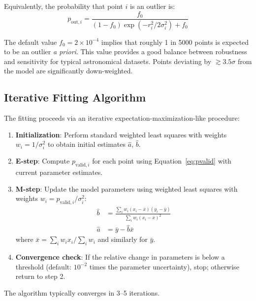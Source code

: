 \documentclass[twocolumn]{aastex631}
\begin{document}
Equivalently, the probability that point $i$ is an outlier is:
\begin{equation}
    p_{\mathrm{out},i} = \frac{f_0}{(1-f_0) \exp\left(-r_i^2/2\sigma_i^2\right) + f_0}
    \label{eq:pout}
\end{equation}

The default value $f_0 = 2 \times 10^{-4}$ implies that roughly 1 in 5000 points is
expected to be an outlier \emph{a priori}. This value provides a good balance between
robustness and sensitivity for typical astronomical datasets. Points deviating by
$\gtrsim 3.5\sigma$ from the model are significantly down-weighted.


\subsection{Iterative Fitting Algorithm}
\label{sec:algorithm}

The fitting proceeds via an iterative expectation-maximization-like procedure:

\begin{enumerate}
    \item \textbf{Initialization}: Perform standard weighted least squares with
          weights $w_i = 1/\sigma_i^2$ to obtain initial estimates $\hat{a}$, $\hat{b}$.
    
    \item \textbf{E-step}: Compute $p_{\mathrm{valid},i}$ for each point using
          Equation~\ref{eq:pvalid} with current parameter estimates.
    
    \item \textbf{M-step}: Update the model parameters using weighted least squares
          with weights $w_i = p_{\mathrm{valid},i}/\sigma_i^2$:
          \begin{align}
              \hat{b} &= \frac{\sum_i w_i (x_i-\bar{x})(y_i-\bar{y})}{\sum_i w_i (x_i-\bar{x})^2} \\
              \hat{a} &= \bar{y} - \hat{b}\bar{x}
          \end{align}
          where $\bar{x} = \sum_i w_i x_i / \sum_i w_i$ and similarly for $\bar{y}$.
    
    \item \textbf{Convergence check}: If the relative change in parameters is below
          a threshold (default: $10^{-2}$ times the parameter uncertainty), stop;
          otherwise return to step 2.
\end{enumerate}

The algorithm typically converges in 3--5 iterations.
\end{document}
